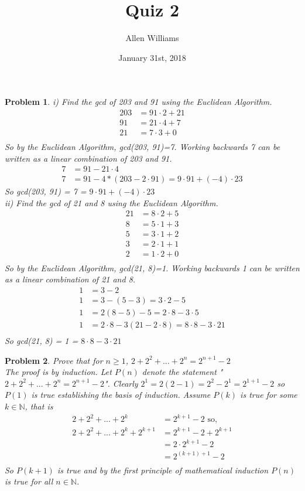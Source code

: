 \documentclass{article}
\title{Quiz 2}
\author{Allen Williams }
\date{January 31st, 2018}
\newtheorem{Problem}{Problem}
\begin{document}
\maketitle

\begin{Problem}
 i) Find the gcd of 203 and 91 using the Euclidean Algorithm. \\
 \begin{align*}
     203&=91\cdot 2+21 \\
     91&=21\cdot 4 + 7 \\
     21&=7\cdot 3 + 0 \\
 \end{align*}
 So by the Euclidean Algorithm, gcd(203, 91)=7.  Working backwards 7 can be written as a linear combination of 203 and 91. \\
 \begin{align*}
     7&=91-21\cdot 4 \\
     7&=91-4*(203-2\cdot 91)=9\cdot91+(-4)\cdot23
 \end{align*}
So gcd(203, 91) = 7 = $9\cdot91+(-4)\cdot23$ \\
ii) Find the gcd of 21 and 8 using the Euclidean Algorithm. \\
\begin{align*}
    21&=8\cdot 2+5 \\
    8&=5\cdot1+3 \\
    5&=3\cdot1+2 \\
    3&=2\cdot1+1 \\
    2&=1\cdot2+0 \\
\end{align*}
So by the Euclidean Algorithm, gcd(21, 8)=1.  Working backwards 1 can be written as a linear combination of 21 and 8. \\
\begin{align*}
    1&=3-2 \\
    1&=3-(5-3)=3\cdot2-5 \\
    1&=2(8-5)-5=2\cdot8-3\cdot5 \\
    1&=2\cdot8-3(21-2\cdot8)=8\cdot8-3\cdot21 \\
\end{align*}
So gcd(21, 8) = 1 = $8\cdot8-3\cdot21$
\end{Problem}
\begin{Problem}
Prove that for $n\geq1$, $2+2^2+...+2^n=2^{n+1}-2$ \\
The proof is by induction.  Let $P(n)$ denote the statement "$2+2^2+...+2^n=2^{n+1}-2$". Clearly $2^1=2(2-1)=2^2-2^1=2^{1+1}-2$ so $P(1)$ is true establishing the basis of induction.  Assume $P(k)$ is true for some $k\in\mathbb{N}$, that is \\
\begin{align*}
    2+2^2+...+2^k&=2^{k+1}-2\text{  so,} \\
    2+2^2+...+2^k+2^{k+1}&=2^{k+1}-2+2^{k+1} \\
    &=2\cdot2^{k+1}-2 \\
    &=2^{(k+1)+1}-2 \\
\end{align*}
So $P(k+1)$ is true and by the first principle of mathematical induction $P(n)$ is true for all $n\in\mathbb{N}$.
\end{Problem}
\end{document}
